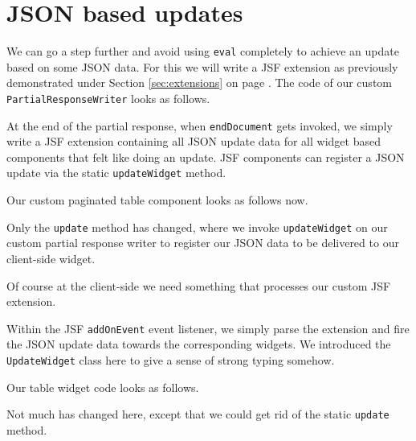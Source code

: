 \section{JSON based updates}
We can go a step further and avoid using \texttt{eval} completely to achieve an update based on some JSON data.
For this we will write a JSF extension as previously demonstrated under Section \ref{sec:extensions} on page \pageref{sec:extensions}.
The code of our custom \texttt{PartialResponseWriter} looks as follows.

At the end of the partial response, when \texttt{endDocument} gets invoked, we simply write a JSF extension containing all JSON update data for all widget based components that felt like doing an update.
JSF components can register a JSON update via the static \texttt{updateWidget} method.

Our custom paginated table component looks as follows now.

Only the \texttt{update} method has changed, where we invoke \texttt{updateWidget} on our custom partial response writer to register our JSON data to be delivered to our client-side widget.

Of course at the client-side we need something that processes our custom JSF extension.

Within the JSF \texttt{addOnEvent} event listener, we simply parse the extension and fire the JSON update data towards the corresponding widgets.
We introduced the \texttt{UpdateWidget} class here to give a sense of strong typing somehow.

Our table widget code looks as follows.

Not much has changed here, except that we could get rid of the static \texttt{update} method.


